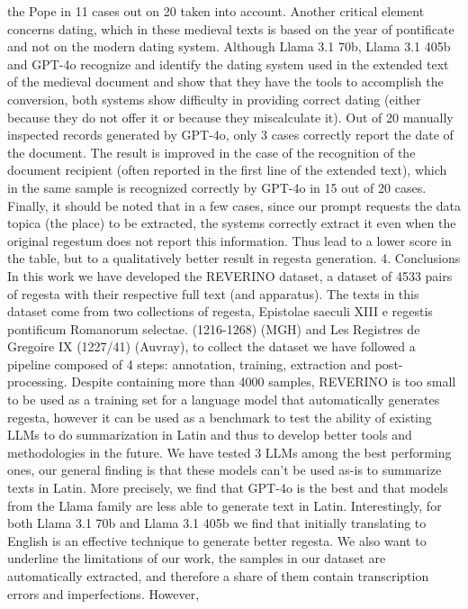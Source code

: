 {the Pope in 11 cases out on 20 taken into account. Another critical element concerns dating, which in
these medieval texts is based on the year of pontificate and not on the modern dating system. Although
Llama 3.1 70b, Llama 3.1 405b and GPT-4o recognize and identify the dating system used in the extended
text of the medieval document and show that they have the tools to accomplish the conversion, both
systems show difficulty in providing correct dating (either because they do not offer it or because they
miscalculate it). Out of 20 manually inspected records generated by GPT-4o, only 3 cases correctly
report the date of the document. The result is improved in the case of the recognition of the document
recipient (often reported in the first line of the extended text), which in the same sample is recognized
correctly by GPT-4o in 15 out of 20 cases.
Finally, it should be noted that in a few cases, since our prompt requests the data topica (the place)
to be extracted, the systems correctly extract it even when the original regestum does not report this
information. Thus lead to a lower score in the table, but to a qualitatively better result in regesta
generation.
4. Conclusions
In this work we have developed the REVERINO dataset, a dataset of 4533 pairs of regesta with their
respective full text (and apparatus). The texts in this dataset come from two collections of regesta,
Epistolae saeculi XIII e regestis pontificum Romanorum selectae. (1216-1268) (MGH) and Les Registres
de Gregoire IX (1227/41) (Auvray), to collect the dataset we have followed a pipeline composed of 4
steps: annotation, training, extraction and post-processing.
Despite containing more than 4000 samples, REVERINO is too small to be used as a training set
for a language model that automatically generates regesta, however it can be used as a benchmark to
test the ability of existing LLMs to do summarization in Latin and thus to develop better tools and
methodologies in the future.
We have tested 3 LLMs among the best performing ones, our general finding is that these models
can’t be used as-is to summarize texts in Latin. More precisely, we find that GPT-4o is the best and that
models from the Llama family are less able to generate text in Latin. Interestingly, for both Llama 3.1
70b and Llama 3.1 405b we find that initially translating to English is an effective technique to generate
better regesta.
We also want to underline the limitations of our work, the samples in our dataset are automatically
extracted, and therefore a share of them contain transcription errors and imperfections. However,
}
